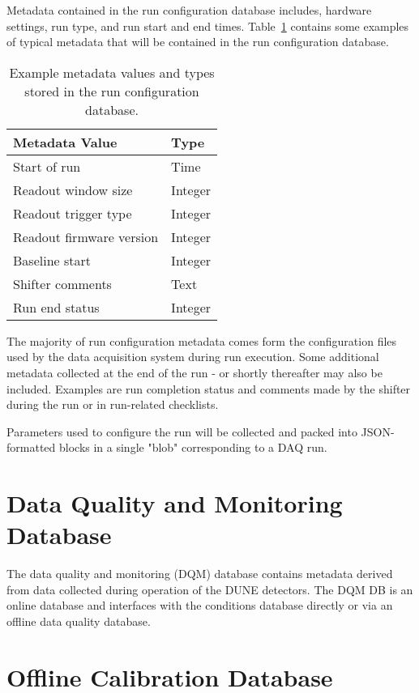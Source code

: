 Metadata contained in the run configuration database includes, hardware settings, run type, and run start and end times. Table~\ref{table:runconfig} contains some examples of typical metadata that will be contained in the run configuration database. 


\begin{table}[h!]
\centering
 \begin{tabular}{||l| l ||} 
 \hline
 Metadata Value & Type  \\ [0.5ex] 
 \hline\hline
Start of run   &  Time \\ \hline
Readout window size  & Integer  \\ \hline
Readout trigger type  &  Integer \\ \hline
Readout firmware version &  Integer \\ \hline
Baseline start &  Integer \\ \hline
Shifter comments &  Text \\ \hline
Run end status & Integer \\ [1ex] 
\hline
\end{tabular}
\caption{Example metadata values and types stored in the run configuration database.}
\label{table:runconfig}
\end{table}

The majority of run configuration metadata comes form the configuration files used by the data acquisition system during run execution. Some additional metadata collected at the end of the run - or shortly thereafter may also be included. Examples are run completion status and comments made by the shifter during the run or in run-related checklists.

Parameters used to configure the run will be collected and packed into JSON-formatted blocks in a single "blob" corresponding to a DAQ run.   

\section{Data Quality and Monitoring Database}
\label{sec:db:dqm}  

The data quality and monitoring (DQM) database contains metadata derived from data collected during operation of the DUNE detectors. The DQM DB is an online database and interfaces with the conditions database directly or via an offline data quality database.

\section{Offline Calibration Database}
\label{sec:db:calib} 

